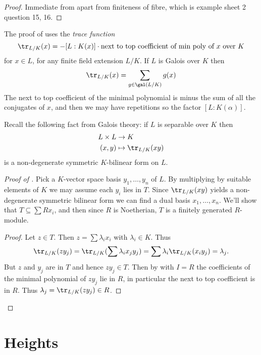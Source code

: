 \documentclass[a4paper]{article}
\begin{document}
\begin{proof}
  Immediate from  apart from finiteness of fibre, which is example sheet 2 question 15, 16.
\end{proof}

The proof of  uses the \emph{trace function}
\[
  \tr_{L/K}(x) = - [L: K(x)] \cdot \text{next to top coefficient of min poly of \(x\) over \(K\)}
\]
for \(x \in L\), for any finite field extension \(L/K\). If \(L\) is Galois over \(K\) then
\[
  \tr_{L/K}(x) = \sum_{g \in \gal(L/K)} g(x)
\]
The next to top coefficient of the minimal polynomial is minus the sum of all the conjugates of \(x\), and then we may have repetitions so the factor \([L: K(\alpha)]\).

Recall the following fact from Galois theory: if \(L\) is separable over \(K\) then
\begin{align*}
  L \times L &\to K \\
  (x, y) &\mapsto \tr_{L/K}(xy)
\end{align*}
is a non-degenerate symmetric \(K\)-bilinear form on \(L\).

\begin{proof}[Proof of ]
  Pick a \(K\)-vector space basis \(y_1, \dots, y_n\) of \(L\). By multiplying by suitable elements of \(K\) we may assume each \(y_i\) lies in \(T\). Since \(\tr_{L/K}(xy)\) yields a non-degenerate symmetric bilinear form we can find a dual basis \(x_1, \dots, x_n\). We'll show that \(T \subseteq \sum Rx_i\), and then since \(R\) is Noetherian, \(T\) is a finitely generated \(R\)-module.

  \begin{proof}
    Let \(z \in T\). Then \(z = \sum \lambda_i x_i\) with \(\lambda_i \in K\). Thus
    \[
      \tr_{L/K}(zy_j) = \tr_{L/K}(\sum \lambda_i x_j y_j) = \sum \lambda_i \tr_{L/K}(x_i y_j) = \lambda_j.
    \]
    But \(z\) and \(y_j\) are in \(T\) and hence \(zy_j \in T\). Then by  with \(I = R\) the coefficients of the minimal polynomial of \(zy_j\) lie in \(R\), in particular the next to top coefficient is in \(R\). Thus \(\lambda_j = \tr_{L/K}(zy_j) \in R\).
  \end{proof}
\end{proof}

\section{Heights}
\end{document}
